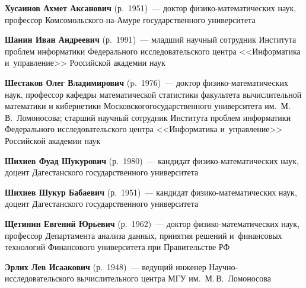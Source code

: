 \begin{multicols}{2}

\noindent
\textbf{Хусаинов Ахмет Аксанович} (р.\ 1951)~--- 
доктор фи\-зи\-ко-ма\-те\-ма\-ти\-че\-ских наук, профессор 
Ком\-со\-моль\-ско\-го-на-Аму\-ре государственного университета


\noindent
\textbf{Шанин Иван Андреевич} (р.\ 1991)~--- 
младший научный сотрудник Института проб\-лем информатики Федерального 
исследовательского центра <<Информатика и~управ\-ле\-ние>> 
Российской академии наук


\noindent
\textbf{Шестаков Олег Владимирович} (p.\ 1976)~--- 
доктор фи\-зи\-ко-ма\-те\-ма\-ти\-че\-ских наук, 
профессор кафедры математической статистики факультета вычислительной 
математики и кибернетики Московского\linebreak государственного университета им.\
 М.\,В.~Ломоносова; старший научный со\-труд\-ник Института проб\-лем 
 информатики Федерального исследовательского цент\-ра <<Информатика и~управ\-ле\-ние>>
 \mbox{Российской} академии наук


\noindent
\textbf{Шихиев Фуад Шукурович} (р.\ 1980)~--- 
кандидат фи\-зи\-ко-ма\-те\-ма\-ти\-че\-ских наук, доцент 
Дагестанского государственного университета




\noindent
\textbf{Шихиев Шукур Бабаевич} (р.\ 1951)~--- 
кандидат фи\-зи\-ко-ма\-те\-ма\-ти\-че\-ских наук, 
доцент Дагестанского государственного университета


\noindent
\textbf{Щетинин Евгений Юрьевич} (р.\ 1962)~--- доктор фи\-зи\-ко-ма\-те\-ма\-ти\-че\-ских наук, 
профессор Департамента анализа данных, принятия решений 
и~финансовых технологий Финансового университета при Правительстве РФ



\noindent
\textbf{Эрлих Лев Исаакович} (р.\ 1948)~--- 
ведущий инженер На\-уч\-но-ис\-сле\-до\-ва\-тель\-ско\-го 
вычислительного центра МГУ им.\ М.\,В.~Ломоносова


\end{multicols}
